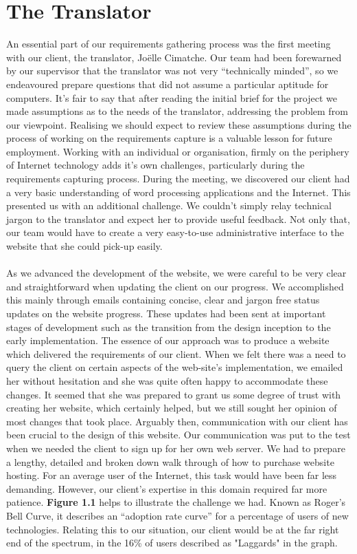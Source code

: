 \documentclass{l3proj}
\begin{document}
\section{The Translator}
An essential part of our requirements gathering process was the first meeting
with our client, the translator, Jo\"{e}lle Cimatche. Our team had been forewarned by our
supervisor that the translator was not very ``technically minded'', so we
endeavoured prepare questions that did not assume a particular aptitude for
computers. It's fair to say that after reading the initial brief for the project
we made assumptions as to the needs of the translator, addressing the problem
from our viewpoint. Realising we should expect to review these assumptions
during the process of working on the requirements capture is a valuable lesson
for future employment. Working with an individual or organisation, firmly on the
periphery of Internet technology adds it's own challenges, particularly during
the requirements capturing process. During the meeting, we discovered our client
had a very basic understanding of word processing applications and the Internet. 
This presented us with an additional challenge. We couldn't
simply relay technical jargon to the translator and expect her to provide useful
feedback. Not only that, our team would have to create a very easy-to-use administrative
interface to the website that she could pick-up easily.\\
\\
As we advanced the development of the website, we were careful to be very clear
and straightforward when updating the client on our progress. We accomplished this
mainly through emails containing concise, clear and jargon free status updates
on the website progress. These updates had been sent at important stages of
development such as the transition from the design inception to the early
implementation. The essence of our approach was to produce a website which delivered the requirements of our client. When we felt there
was a need to query the client on certain aspects of the
web-site's implementation, we emailed her without hesitation and she was quite often happy to
accommodate these changes. It seemed that she was prepared to grant us some
degree of trust with creating her website, which certainly helped, but we still
sought her opinion of most changes that took place. Arguably then, communication
with our client has been crucial to the design of this website. Our
communication was put to the test when we needed the client to sign up for her own
web server. We had to prepare a lengthy, detailed and broken down walk through
of how to purchase website hosting. For an average user of the Internet, this
task would have been far less demanding. However, our client's expertise in this
domain required far more patience. \textbf{Figure 1.1} helps to illustrate the
challenge we had. Known as Roger's Bell Curve, it describes an ``adoption rate curve'' for a percentage of
users of new technologies. Relating this to our situation, our client would be at the far right end of the spectrum, in the 16\% of
users described as "Laggards" in the graph.\\
	
\end{document}
